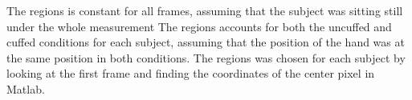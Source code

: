 The regions is constant for all frames, assuming that the subject was sitting still under the whole measurement
The regions accounts for both the uncuffed and cuffed conditions for each subject, assuming that the position of the hand was at the same position in both conditions. 
The regions was chosen for each subject by looking at the first frame and finding the coordinates of the center pixel in Matlab. 


